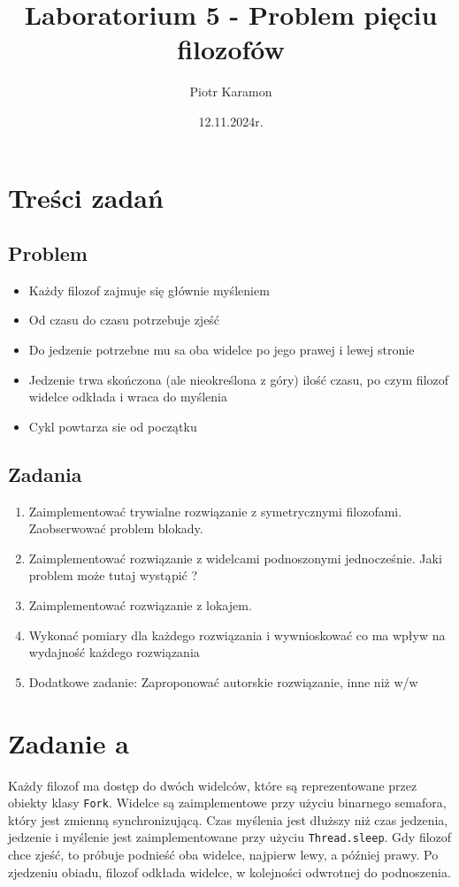 \documentclass[11pt]{article}
\author{Piotr Karamon}
\date{12.11.2024r.}
\title{Laboratorium 5 - Problem pięciu filozofów}
\begin{document}
\maketitle
\section*{Treści zadań}
\label{sec:org34ddec8}
\subsection*{Problem}
\label{sec:org15a5de5}
\begin{itemize}
\item Każdy filozof zajmuje się głównie myśleniem
\item Od czasu do czasu potrzebuje zjeść
\item Do jedzenie potrzebne mu sa oba widelce po jego prawej i lewej stronie
\item Jedzenie trwa skończona (ale nieokreślona z góry) ilość czasu, po czym filozof widelce odkłada i wraca do myślenia
\item Cykl powtarza sie od początku
\end{itemize}
\subsection*{Zadania}
\label{sec:orgd0a46f7}
\begin{enumerate}
\item Zaimplementować trywialne rozwiązanie z symetrycznymi filozofami. Zaobserwować problem blokady.
\item Zaimplementować rozwiązanie z widelcami podnoszonymi jednocześnie. Jaki problem może tutaj wystąpić ?
\item Zaimplementować rozwiązanie z lokajem.
\item Wykonać pomiary dla każdego rozwiązania i wywnioskować co ma wpływ na wydajność każdego rozwiązania
\item Dodatkowe zadanie: Zaproponować autorskie rozwiązanie, inne niż w/w
\end{enumerate}
\section*{Zadanie a}
\label{sec:orgfdf73b1}

Każdy filozof ma dostęp do dwóch widelców, które są reprezentowane przez obiekty klasy
\texttt{Fork}. Widelce są zaimplementowe przy użyciu binarnego semafora, który jest zmienną
synchronizującą. Czas myślenia jest dłuższy niż czas jedzenia,
jedzenie i myślenie jest zaimplementowane przy użyciu \texttt{Thread.sleep}.
Gdy filozof chce zjeść, to próbuje podnieść oba widelce, najpierw lewy, a później prawy.
Po zjedzeniu obiadu, filozof odkłada widelce, w kolejności odwrotnej do podnoszenia.
\end{document}
